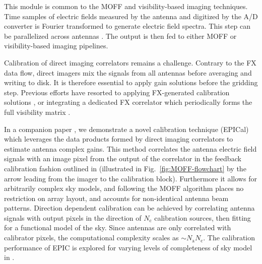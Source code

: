 \documentclass[a4paper,fleqn,usenatbib]{mnras}
\begin{document}
\par\medskip
{}
\par\medskip
\noindent This module is common to the MOFF and visibility-based imaging 
techniques. Time samples of electric fields measured by the antenna and 
digitized by the A/D converter is Fourier transformed to generate electric 
field spectra. This step can be parallelized across antennas%
. The output is then fed to either MOFF or 
visibility-based imaging pipelines.


\par\medskip
{}
\par\medskip
\noindent Calibration of direct imaging correlators remains a challenge. Contrary
to the FX data flow, direct imagers mix the signals from all antennas before
averaging and writing to disk. It is therefore essential to apply gain solutions 
before the gridding step. Previous efforts have resorted to applying FX-generated
calibration solutions \citep{zhe14,fos14}, or integrating a dedicated FX 
correlator which periodically forms the full visibility matrix 
\citep{wij09,dev09}. 

In a companion paper \citep{bea16}, we demonstrate a novel calibration 
technique (EPICal) which leverages the data products formed by direct imaging 
correlators to estimate antenna complex gains. This method correlates the antenna 
electric field signals with an image pixel from the output of the correlator in 
the feedback calibration fashion outlined in \citealt{mor11} (illustrated in 
Fig.~\ref{fig:MOFF-flowchart} by the arrow leading from the imager to the 
calibration block). Furthermore it allows for arbitrarily complex sky models, 
and following the MOFF algorithm places no restriction on array layout, and 
accounts for non-identical antenna beam patterns. Direction dependent calibration 
can be achieved by correlating antenna signals with output pixels in the 
direction of $N_\textrm{c}$ calibration sources, then fitting for a functional 
model of the sky. Since antennas are only correlated with calibrator pixels, the 
computational complexity scales as $\sim N_\textrm{a} N_\textrm{c}$. The calibration performance of EPIC is explored for varying levels of completeness of sky model in \citet{bea16}.
\end{document}
